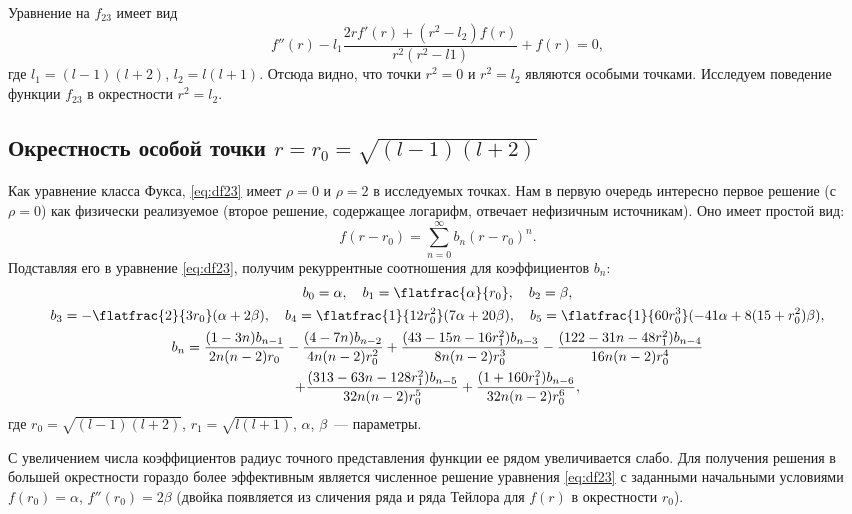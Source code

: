 \documentclass[\docroot/report.tex]{subfiles}
\begin{document}
Уравнение на $f_{23}$ имеет вид
%
\begin{equation}\label{eq:df23}
    f''(r) - l_1 \frac{ 2 r f'(r) + (r^2 - l_2) f(r) }{ r^2 (r^2 - l1) } + f(r) = 0 ,
\end{equation}
%
где $l_1 = (l-1)(l+2)$, $l_2 = l(l+1)$. Отсюда видно, что точки $r^2 = 0$ и $r^2 = l_2$ являются особыми точками. Исследуем поведение функции $f_{23}$ в окрестности $r^2 = l_2$.

%
%
%
%
%
%

\subsection{Окрестность особой точки $r = r_0 = \sqrt{(l-1)(l+2)}$}

Как уравнение класса Фукса, \autoref{eq:df23} имеет $\rho = 0$ и $\rho = 2$ в исследуемых точках. Нам в первую очередь интересно первое решение (с $\rho = 0$) как физически реализуемое (второе решение, содержащее логарифм, отвечает нефизичным источникам). Оно имеет простой вид:
%
\begin{equation}\label{eq:f23-series}
    f(r - r_0) = \sum\limits_{n=0}^\infty b_n (r - r_0)^n .
\end{equation}
%
Подставляя его в уравнение \autoref{eq:df23}, получим рекуррентные соотношения для коэффициентов $b_n$:
%
\begin{equation}\begin{gathered}\label{eq:f23-series}
    b_0 = \alpha, \quad
    b_1 = \flatfrac{\alpha}{r_0}, \quad
    b_2 = \beta, \\
    b_3 = - \flatfrac{2}{3 r_0} (\alpha + 2 \beta), \quad
    b_4 = \flatfrac{1}{12 r_0^2} (7 \alpha + 20 \beta), \quad
    b_5 = \flatfrac{1}{60 r_0^3} (-41 \alpha + 8 (15 + r_0^2) \beta), \\
    b_n = \frac{(1-3n)b_{n-1}}{2n(n-2)r_0}
        - \frac{(4-7n)b_{n-2}}{4n(n-2)r_0^2}
        + \frac{(43-15n-16r_1^2)b_{n-3}}{8n(n-2)r_0^3}
        - \frac{(122-31n-48r_1^2)b_{n-4}}{16n(n-2)r_0^4} \\
        + \frac{(313-63n-128r_1^2)b_{n-5}}{32n(n-2)r_0^5}
        + \frac{(1+160r_1^2)b_{n-6}}{32n(n-2)r_0^6} ,
\end{gathered}\end{equation}
%
где $r_0 = \sqrt{(l-1)(l+2)}$, $r_1 = \sqrt{l(l+1)}$, $\alpha$, $\beta$~--- параметры.

С увеличением числа коэффициентов радиус точного представления функции ее рядом увеличивается слабо. Для получения решения в большей окрестности гораздо более эффективным является численное решение уравнения \autoref{eq:df23} с заданными начальными условиями $f(r_0) = \alpha$, $f''(r_0) = 2\beta$ (двойка появляется из сличения ряда \label{eq:f23-series} и ряда Тейлора для $f(r)$ в окрестности $r_0$).
\end{document}
